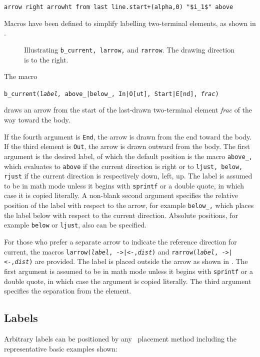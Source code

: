   \verb|arrow right arrowht from last line.start+(alpha,0) "$i_1$" above|

\enlargethispage{\baselineskip}%
Macros have been defined to simplify labelling two-terminal
elements, as shown in .
\begin{figure}[ht]
   
   \caption{Illustrating {\tt b\_current, larrow,} and {\tt rarrow}.
      The drawing direction is to the right.}
   \label{currents}
   \end{figure}
The macro

   {\tt b\_current({\sl label,} above\_|below\_, In|O[ut], Start|E[nd],
   {\sl frac})}

\noindent
draws an arrow from the start of the last-drawn two-terminal element
{\sl frac} of the way toward the body.

If the fourth argument is {\tt End}, the arrow is drawn from the end
toward the body.
If the third element is {\tt Out}, the arrow is drawn outward from the body.
The first argument is the desired label, of which the default position is
the macro {\tt above\_,} which evaluates to {\tt above} if the current
direction is right or to {\tt ljust, below, rjust} if the current
direction is respectively down, left, up.  The label is assumed to be
in math mode unless it begins with {\tt sprintf} or a double quote, in which
case it is copied literally.  A non-blank second argument specifies the
relative position of the label with respect to the arrow, for example
{\tt below\_,} which places the label below with respect to the current
direction.  Absolute positions, for example {\tt below} or {\tt ljust},
also can be specified.

For those who prefer a separate arrow to indicate the reference
direction for current, the macros {\tt larrow({\sl label}, ->|<-,{\sl dist})}
and {\tt rarrow({\sl label}, ->|<-,{\sl dist})} are provided.  The label is
placed outside the arrow as shown in .
The first argument is assumed to be in math mode unless
it begins with {\tt sprintf} or a double
quote, in which case the argument is copied literally.
The third argument specifies the separation from the element.

\subsection{Labels\label{Labels:}}
   Arbitrary labels
   can be positioned by any \pic\ placement method including the
   representative basic examples shown:

